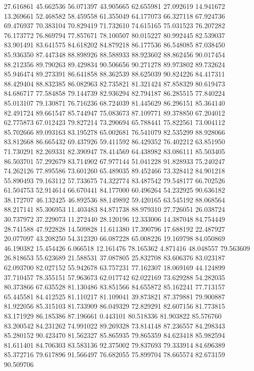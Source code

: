 27.616861
45.662536
56.071397
43.905665
62.655981
27.092619
14.941672
13.269661
52.468582
58.459558
61.355049
64.177073
66.327118
67.924736
69.476937
70.383104
70.829419
71.732610
74.615165
75.031523
76.207282
76.173772
76.869794
77.857671
78.100507
80.015227
80.992445
82.539037
83.901491
83.641575
84.618202
84.879218
86.177536
86.548085
87.038450
85.936350
87.447348
88.898926
88.588933
88.923602
88.862456
90.017454
88.212356
89.790263
89.429834
90.506656
90.271278
89.973802
89.732624
85.946474
89.273391
86.641858
88.362539
88.625039
90.824226
84.417311
88.429404
88.832385
86.082963
82.735821
81.321424
87.858329
80.619473
84.686717
77.584858
79.144739
82.936294
82.794187
86.285515
77.840224
85.013107
79.130871
76.716236
68.724039
81.445629
86.296151
85.364140
82.491724
89.661547
85.744947
75.083673
87.109771
89.378850
67.204012
62.775873
67.012423
79.827214
73.290694
65.788441
75.822561
73.004112
85.702666
89.093163
83.195278
65.002681
76.541079
82.535299
88.928066
83.812668
86.665432
69.437926
59.411592
86.429352
76.402212
63.851950
71.730291
82.269331
82.390947
78.414569
64.438982
83.086111
85.503405
86.503701
57.292679
83.714902
67.977144
51.041228
91.828933
75.240247
74.262126
77.895586
73.601260
65.489035
89.452466
73.328412
84.901218
55.890493
79.163112
57.733675
74.322774
83.487542
79.548177
66.702526
61.504753
52.914614
66.670441
84.177000
60.496264
54.232925
90.636182
38.172707
46.132425
46.892536
88.149892
59.420165
63.545192
88.068564
88.217141
85.306953
11.403483
84.871738
88.979310
27.726051
26.038724
30.737972
37.229073
11.272440
28.120196
12.333006
14.387048
84.754449
28.741588
47.922828
14.509828
11.611380
17.390796
17.688192
22.487927
20.077097
43.208250
54.312320
66.087228
65.008226
19.169798
84.050869
46.190382
15.454426
6.066518
12.161476
78.165362
4.871416
48.048557
79.563609
26.818653
55.623689
21.588531
37.087805
25.832708
83.606376
83.023187
62.093700
82.027152
55.942678
63.757231
77.162307
18.069169
44.124899
37.710457
78.355151
57.963673
62.017742
62.022169
73.629288
54.282035
80.373866
67.635528
81.130486
83.851566
84.655872
85.162241
77.713157
65.445581
84.412525
81.110217
81.109041
39.873821
87.379881
79.900887
81.922056
85.315103
81.733909
86.049329
72.829291
82.607156
81.773815
83.171929
86.185386
87.196661
0.443101
80.518336
81.903822
85.576760
83.200542
84.231262
74.991022
89.269328
73.814148
87.236557
84.298343
85.280152
90.423470
81.562327
85.865935
79.865359
84.623418
85.982594
81.611401
84.706303
83.583136
92.375002
79.837693
79.333914
84.696389
85.372716
79.617896
91.566497
76.682055
75.899704
78.665574
82.673159
90.509706
